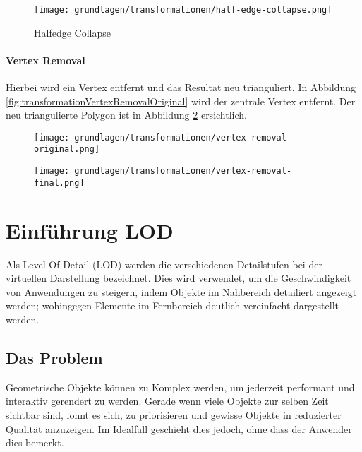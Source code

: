 \begin{figure}[H]
  \centering
  \texttt{[image: grundlagen/transformationen/half-edge-collapse.png]}
  \caption{Halfedge Collapse}
  \label{fig:transformationHalfedgeCollapse}
\end{figure}

\paragraph{Vertex Removal}
Hierbei wird ein Vertex entfernt und das Resultat neu trianguliert.
In Abbildung \ref{fig:transformationVertexRemovalOriginal} wird der zentrale Vertex entfernt. Der neu triangulierte Polygon ist in Abbildung \ref{fig:transformationVertexRemovalFinal} ersichtlich.

\begin{figure}[H]
  \centering
  \begin{minipage}{.5\textwidth}
    \centering
    \texttt{[image: grundlagen/transformationen/vertex-removal-original.png]}
    \label{fig:transformationVertexRemovalOriginal}
  \end{minipage}
  \begin{minipage}{.5\textwidth}
    \centering
    \texttt{[image: grundlagen/transformationen/vertex-removal-final.png]}
    \label{fig:transformationVertexRemovalFinal}
  \end{minipage}
\end{figure}

\section{Einführung LOD}
Als Level Of Detail (LOD) werden die verschiedenen Detailstufen bei der virtuellen Darstellung bezeichnet.
Dies wird verwendet, um die Geschwindigkeit von Anwendungen zu steigern, indem Objekte im Nahbereich detailiert angezeigt werden; wohingegen Elemente im Fernbereich deutlich vereinfacht dargestellt werden.

\subsection{Das Problem}
Geometrische Objekte können zu Komplex werden, um jederzeit performant und interaktiv gerendert zu werden.
Gerade wenn viele Objekte zur selben Zeit sichtbar sind, lohnt es sich, zu priorisieren und gewisse Objekte in reduzierter Qualität anzuzeigen.
Im Idealfall geschieht dies jedoch, ohne dass der Anwender dies bemerkt.


